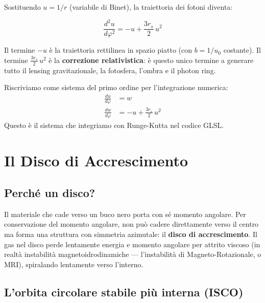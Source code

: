 \documentclass[12pt, a4paper, twoside]{article}
\newenvironment{physbox}[1]{%
  \begin{tcolorbox}[equationbox, title={#1}]
}{%
  \end{tcolorbox}
}
\theoremstyle{definition}
\newcommand{\RS}{r_{\!s}}          %
\begin{document}
Sostituendo $u = 1/r$ (variabile di Binet), la traiettoria dei fotoni diventa:

\begin{physbox}{Equazione di Binet per la luce (RG)}
\begin{equation}
  \frac{d^2 u}{d\varphi^2} = -u + \frac{3\RS}{2}\, u^2
  \label{eq:binet}
\end{equation}
\end{physbox}

Il termine $-u$ è la traiettoria rettilinea in spazio piatto (con $b = 1/u_0$
costante). Il termine $\frac{3\RS}{2}\, u^2$ è la \textbf{correzione relativistica}:
è questo unico termine a generare tutto il lensing gravitazionale, la fotosfera,
l'ombra e il photon ring.

Riscriviamo come sistema del primo ordine per l'integrazione numerica:
\begin{align}
  \frac{du}{d\varphi} &= w \\
  \frac{dw}{d\varphi} &= -u + \frac{3\RS}{2}\, u^2
  \label{eq:ode_system}
\end{align}
Questo è il sistema che integriamo con Runge-Kutta nel codice GLSL.

\newpage

\section{Il Disco di Accrescimento}

\subsection{Perché un disco?}

Il materiale che cade verso un buco nero porta con sé momento angolare.
Per conservazione del momento angolare, non può cadere direttamente verso
il centro ma forma una struttura con simmetria azimutale: il \textbf{disco
di accrescimento}. Il gas nel disco perde lentamente energia e momento angolare
per attrito viscoso (in realtà instabilità magnetoidrodinamiche — l'instabilità
di Magneto-Rotazionale, o MRI), spiralando lentamente verso l'interno.

\subsection{L'orbita circolare stabile più interna (ISCO)}
\end{document}
